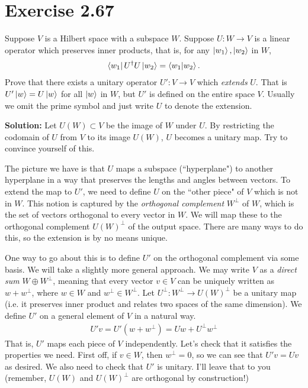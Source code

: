 \documentclass{book}
\begin{document}
\section*{Exercise 2.67}
    Suppose $V$ is a Hilbert space with a subspace $W$. Suppose $U: W \to V$ is a linear operator which preserves inner products, that is, for any $\ket{w_1}, \ket{w_2}$ in $W$,
    \begin{align}
        \bra{w_1}U^\dagger U \ket{w_2} = \braket{w_1}{w_2}.
    \end{align}
    Prove that there exists a unitary operator $U': V\to V$ which \emph{extends} $U$. That is $U'\ket{w} = U\ket{w}$ for all $\ket{w}$ in $W$, but $U'$ is defined on the entire space $V$. Usually we omit the prime symbol and just write $U$ to denote the extension.

    \textbf{Solution:} Let $U(W) \subset V$ be the image of $W$ under $U$. By restricting the codomain of $U$ from $V$ to its image $U(W)$, $U$ becomes a unitary map. Try to convince yourself of this. 

    The picture we have is that $U$ maps a subspace (``hyperplane") to another hyperplane in a way that preserves the lengths and angles between vectors. To extend the map to $U'$, we need to define $U$ on the ``other piece" of $V$ which is not in $W$. This notion is captured by the \emph{orthogonal complement} $W^\perp$ of $W$, which is the set of vectors orthogonal to every vector in $W$. We will map these to the orthogonal complement $U(W)^\perp$ of the output space. There are many ways to do this, so the extension is by no means unique.

    One way to go about this is to define $U'$ on the orthogonal complement via some basis. We will take a slightly more general approach. We may write $V$ as a \emph{direct sum} $W\oplus W^\perp$, meaning that every vector $v \in V$ can be uniquely written as $w + w^\perp$, where $w\in W$ and $w^\perp \in W^\perp$. Let $U^\perp: W^\perp \to U(W)^\perp$ be a unitary map (i.e. it preserves inner product and relates two spaces of the same dimension). We define $U'$ on a general element of $V$ in a natural way.
    \begin{align}
        U'v = U'(w + w^\perp) = Uw + U^\perp w^\perp
    \end{align}
    That is, $U'$ maps each piece of $V$ independently. Let's check that it satisfies the properties we need. First off, if $v \in W$, then $w^\perp = 0$, so we can see that $U' v  = U v$ as desired. We also need to check that $U'$ is unitary. I'll leave that to you (remember, $U(W)$ and $U(W)^\perp$ are orthogonal by construction!)
\end{document}
